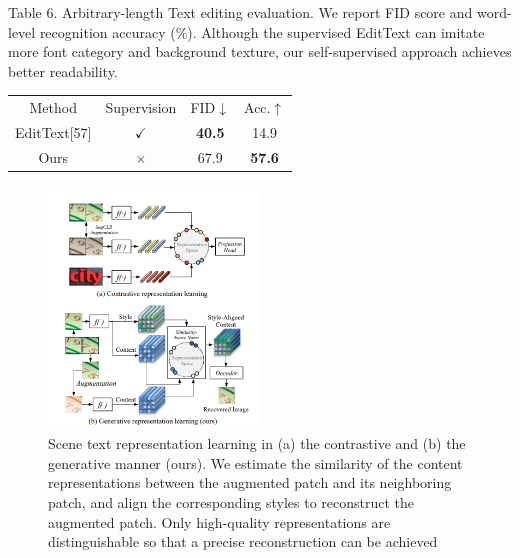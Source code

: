 \documentclass{article}
\begin{document}
\begin{table} [t]

    \captionsetup{justification=centering}
    \captionabove
    {
        Table 6. Arbitrary-length Text editing evaluation. We report FID
        score and word-level recognition accuracy (\%). Although the supervised EditText can imitate more font category and background
        texture, our self-supervised approach achieves better readability.
    }
    \begin{center}
    \begin{tabular}{ c c c c } 
     \hline
        Method & Supervision & FID$\downarrow$ & Acc.$\uparrow$ \\ 
        EditText[57] & $\checkmark$ & \textbf{40.5} & 14.9\\ 
        Ours & $\times$ & 67.9 & \textbf{57.6} \\ 
     \hline
    \end{tabular}
    \end{center}
     
    \label{tab:my_label1}
    
\end{table}






\begin{figure}
    \centering
    \includegraphics[width=0.5\textwidth]{f1.PNG}
    \caption
    { 
        Scene text representation learning in (a) the contrastive
        and (b) the generative manner (ours). We estimate the similarity
        of the content representations between the augmented patch and
        its neighboring patch, and align the corresponding styles to reconstruct the augmented patch. Only high-quality representations are
        distinguishable so that a precise reconstruction can be achieved
    }
    \label{fig:my_figure1}
\end{figure}
\end{document}
